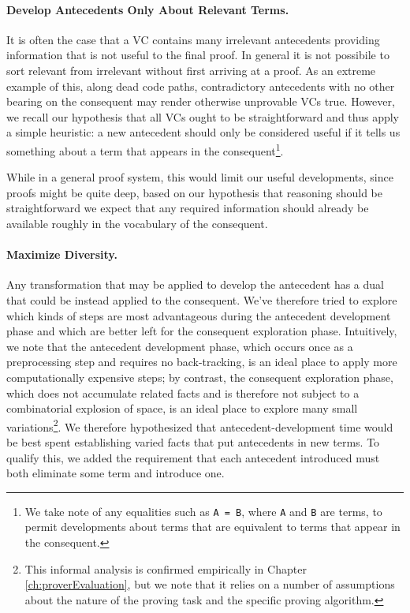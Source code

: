 \paragraph{Develop Antecedents Only About Relevant Terms.}  It is often the case that a VC contains many irrelevant antecedents providing information that is not useful to the final proof.  In general it is not possibile to sort relevant from irrelevant without first arriving at a proof.  As an extreme example of this, along dead code paths, contradictory antecedents with no other bearing on the consequent may render otherwise unprovable VCs true.  However, we recall our hypothesis that all VCs ought to be straightforward and thus apply a simple heuristic: a new antecedent should only be considered useful if it tells us something about a term that appears in the consequent\footnote{We take note of any equalities such as \texttt{A = B}, where \texttt{A} and \texttt{B} are terms, to permit developments about terms that are equivalent to terms that appear in the consequent.}.

While in a general proof system, this would limit our useful developments, since proofs might be quite deep, based on our hypothesis that reasoning should be straightforward we expect that any required information should already be available roughly in the vocabulary of the consequent.

\paragraph{Maximize Diversity.}  Any transformation that may be applied to develop the antecedent has a dual that could be instead applied to the consequent.  We've therefore tried to explore which kinds of steps are most advantageous during the antecedent development phase and which are better left for the consequent exploration phase.  Intuitively, we note that the antecedent development phase, which occurs once as a preprocessing step and requires no back-tracking, is an ideal place to apply more computationally expensive steps; by contrast, the consequent exploration phase, which does not accumulate related facts and is therefore not subject to a combinatorial explosion of space, is an ideal place to explore many small variations\footnote{This informal analysis is confirmed empirically in Chapter \ref{ch:proverEvaluation}, but we note that it relies on a number of assumptions about the nature of the proving task and the specific proving algorithm.}.  We therefore hypothesized that antecedent-development time would be best spent establishing varied facts that put antecedents in new terms.  To qualify this, we added the requirement that each antecedent introduced must both eliminate some term and introduce one.

